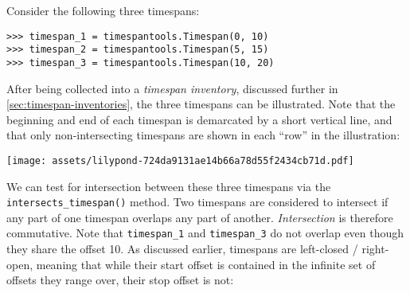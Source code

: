 Consider the following three timespans:

\begin{comment}
<abjad>
timespan_1 = timespantools.Timespan(0, 10)
timespan_2 = timespantools.Timespan(5, 15)
timespan_3 = timespantools.Timespan(10, 20)
</abjad>
\end{comment}

\begin{abjadbookoutput}
\begin{singlespacing}
\vspace{-0.5\baselineskip}
\begin{lstlisting}
>>> timespan_1 = timespantools.Timespan(0, 10)
>>> timespan_2 = timespantools.Timespan(5, 15)
>>> timespan_3 = timespantools.Timespan(10, 20)
\end{lstlisting}
\end{singlespacing}
\end{abjadbookoutput}

\noindent After being collected into a \emph{timespan inventory}, discussed
further in \autoref{sec:timespan-inventories}, the three timespans can be
illustrated. Note that the beginning and end of each timespan is demarcated by
a short vertical line, and that only non-intersecting timespans are shown in
each \enquote{row} in the illustration:

\begin{comment}
<abjad>[hide=true]
timespan_inventory = timespantools.TimespanInventory([
    timespan_1,
    timespan_2,
    timespan_3,
    ])
show(timespan_inventory)
</abjad>
\end{comment}

\begin{abjadbookoutput}
\begin{singlespacing}
\vspace{-0.5\baselineskip}
\noindent\texttt{[image: assets/lilypond-724da9131ae14b66a78d55f2434cb71d.pdf]}
\end{singlespacing}
\end{abjadbookoutput}

\noindent We can test for intersection between these three timespans via the
\texttt{intersects\_timespan()} method. Two timespans are considered to
intersect if any part of one timespan overlaps any part of another.
\emph{Intersection} is therefore commutative. Note that \texttt{timespan\_1}
and \texttt{timespan\_3} do not overlap even though they share the offset 10.
As discussed earlier, timespans are left-closed / right-open, meaning that
while their start offset is contained in the infinite set of offsets they range
over, their stop offset is not:

